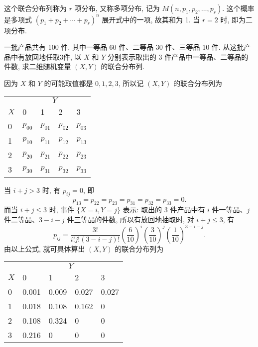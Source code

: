   这个联合分布列称为 $r$ 项分布, 又称多项分布, 记为 $M(n,p_1,p_2,\ldots,p_r)$. 这个概率
  是多项式 $(p_1+p_2+\cdots+p_r)^n$ 展开式中的一项, 故其和为 1. 当 $r=2$ 时, 即为二项分布.
  \begin{example}\label{exam:3.1.4}
    一批产品共有 100 件, 其中一等品 60 件、二等品 30 件、三等品 10 件.
    从这批产品中有放回地任取3件, 以 $X$ 和 $Y$ 分别表示取出的 3 件产品中一等品、二等品的件数, 求二维随机变量 $(X,Y)$ 的联合分布列.
  \end{example}
  \begin{solution}
    因为 $X$ 和 $Y$ 的可能取值都是 $0,1,2,3$, 所以记 $(X,Y)$ 的联合分布列为
    \begin{center}
      \begin{tabularx}{0.8\textwidth}{ZZZZZ}
        \toprule
          &  \\
        $X$ & 0&  1&  2&  3 \\
        &  $p_{00}$& $p_{01}$& $p_{02}$& $p_{03}$\\
        &  $p_{10}$& $p_{11}$& $p_{12}$& $p_{13}$\\
        &  $p_{20}$& $p_{21}$& $p_{22}$& $p_{23}$\\
        &  $p_{30}$& $p_{31}$& $p_{32}$& $p_{33}$\\
        \bottomrule
      \end{tabularx}
    \end{center}
    当 $i+j>3$ 时, 有 $p_{ij}=0$, 即
    \[
      p_{13}=p_{22}=p_{23}=p_{31}=p_{32}=p_{33}=0.
    \]
    而当 $i+j\leq 3$ 时, 事件 $\{X=i,Y=j\}$ 表示: 取出的 3 件产品中有 $i$ 件一等品、$j$ 件二等品、$3-i-j$ 件三等品的件数,
    所以有放回地抽取时, 对 $i+j\leq 3$, 有
    \[
      p_{i j}=\frac{3 !}{i ! j !(3-i-j) !}\left(\frac{6}{10}\right)^{i}\left(\frac{3}{10}\right)^{j}\left(\frac{1}{10}\right)^{3-i-j}.
    \]
    由以上公式, 就可具体算出 $(X,Y)$ 的联合分布列为
    \begin{center}
      \begin{tabularx}{0.8\textwidth}{ZZZZZ}
        \toprule
          &  \\
        $X$ & 0&  1&  2&  3 \\
        &  0.001   & 0.009   & 0.027   & 0.027   \\
        &  0.018   & 0.108   & 0.162   & 0       \\
        &  0.108   & 0.324   & 0       & 0       \\
        &  0.216   & 0       & 0       & 0       \\
        \bottomrule
      \end{tabularx}
    \end{center}
  \end{solution}
